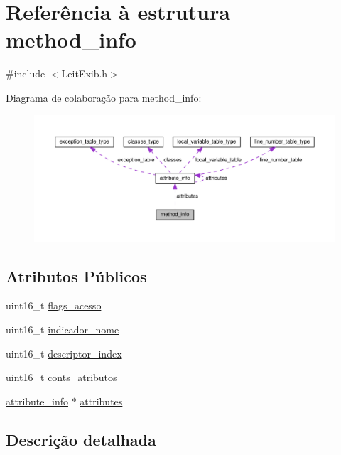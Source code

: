 \hypertarget{structmethod__info}{\section{Referência à estrutura method\-\_\-info}
\label{structmethod__info}
}


{\ttfamily \#include $<$Leit\-Exib.\-h$>$}



Diagrama de colaboração para method\-\_\-info\-:\nopagebreak
\begin{figure}[H]
\begin{center}
\leavevmode
\includegraphics[width=350pt]{structmethod__info__coll__graph}
\end{center}
\end{figure}
\subsection*{Atributos Públicos}
\begin{DoxyCompactItemize}
\item 
uint16\-\_\-t \hyperlink{structmethod__info_a200169cf04858f0fe263f2b905ccb0bf}{flags\-\_\-acesso}
\item 
uint16\-\_\-t \hyperlink{structmethod__info_af759f4abed4c00637446765268f8c4cf}{indicador\-\_\-nome}
\item 
uint16\-\_\-t \hyperlink{structmethod__info_abccd6a5202d4c0ee1be6b89692d0352a}{descriptor\-\_\-index}
\item 
uint16\-\_\-t \hyperlink{structmethod__info_a23e8e7b47fe7f4e69e00b96313ec76ad}{conts\-\_\-atributos}
\item 
\hyperlink{structattribute__info}{attribute\-\_\-info} $\ast$ \hyperlink{structmethod__info_a8ce4caaa03680c91f548558a38647ad8}{attributes}
\end{DoxyCompactItemize}


\subsection{Descrição detalhada}



